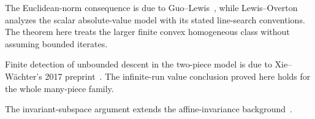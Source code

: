 The Euclidean-norm consequence is due to Guo--Lewis~\cite[Corollary~4.2]{GL18}, while Lewis--Overton~\cite[Section~5.1]{LO} analyzes the scalar absolute-value model with its stated line-search conventions. The theorem here treats the larger finite convex homogeneous class without assuming bounded iterates.

Finite detection of unbounded descent in the two-piece model is due to Xie--W\"achter's 2017 preprint~\cite[Theorem~IV.1]{XW}. The infinite-run value conclusion proved here holds for the whole many-piece family.

The invariant-subspace argument extends the affine-invariance background~\cite[Theorem~II.1]{XW}.
